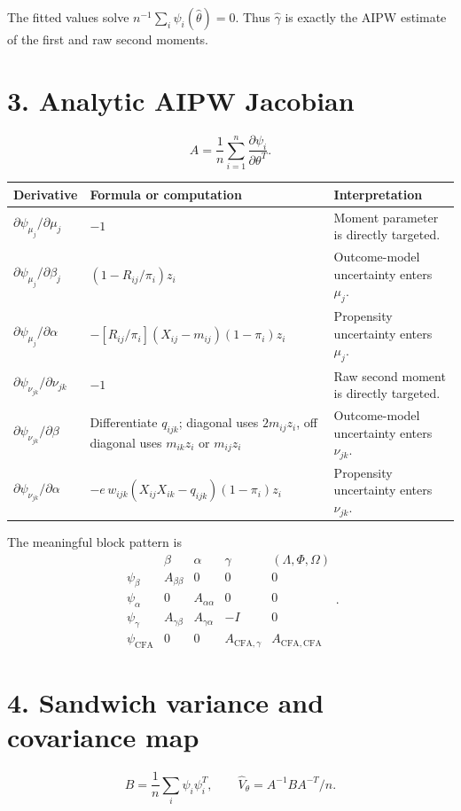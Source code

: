 \documentclass[10pt]{article}
\begin{document}
The fitted values solve $n^{-1}\sum_i\psi_i(\hat\theta)=0$. Thus $\hat\gamma$ is exactly the AIPW estimate of the first and raw second moments.

\section*{3. Analytic AIPW Jacobian}
\[
A=\frac{1}{n}\sum_{i=1}^n\frac{\partial\psi_i}{\partial\theta^T}.
\]

\begin{tabularx}{\linewidth}{@{}l Y Y@{}}
\toprule
Derivative & Formula or computation & Interpretation \\
\midrule
$\partial\psi_{\mu_j}/\partial\mu_j$ & $-1$ & Moment parameter is directly targeted. \\
$\partial\psi_{\mu_j}/\partial\beta_j$ & $(1-R_{ij}/\pi_i)z_i$ & Outcome-model uncertainty enters $\mu_j$. \\
$\partial\psi_{\mu_j}/\partial\alpha$ & $-[R_{ij}/\pi_i](X_{ij}-m_{ij})(1-\pi_i)z_i$ & Propensity uncertainty enters $\mu_j$. \\
$\partial\psi_{\nu_{jk}}/\partial\nu_{jk}$ & $-1$ & Raw second moment is directly targeted. \\
$\partial\psi_{\nu_{jk}}/\partial\beta$ & Differentiate $q_{ijk}$; diagonal uses $2m_{ij}z_i$, off diagonal uses $m_{ik}z_i$ or $m_{ij}z_i$ & Outcome-model uncertainty enters $\nu_{jk}$. \\
$\partial\psi_{\nu_{jk}}/\partial\alpha$ & $-e\,w_{ijk}(X_{ij}X_{ik}-q_{ijk})(1-\pi_i)z_i$ & Propensity uncertainty enters $\nu_{jk}$. \\
\bottomrule
\end{tabularx}

The meaningful block pattern is
\[
\begin{array}{c|cccc}
 & \beta & \alpha & \gamma & (\Lambda,\Phi,\Omega)\\ \hline
\psi_\beta & A_{\beta\beta} & 0 & 0 & 0\\
\psi_\alpha & 0 & A_{\alpha\alpha} & 0 & 0\\
\psi_\gamma & A_{\gamma\beta} & A_{\gamma\alpha} & -I & 0\\
\psi_{\mathrm{CFA}} & 0 & 0 & A_{\mathrm{CFA},\gamma} & A_{\mathrm{CFA},\mathrm{CFA}}
\end{array}.
\]

\section*{4. Sandwich variance and covariance map}
\[
B=\frac{1}{n}\sum_i\psi_i\psi_i^T,\qquad
\widehat V_\theta=A^{-1}BA^{-T}/n.
\]
\end{document}
